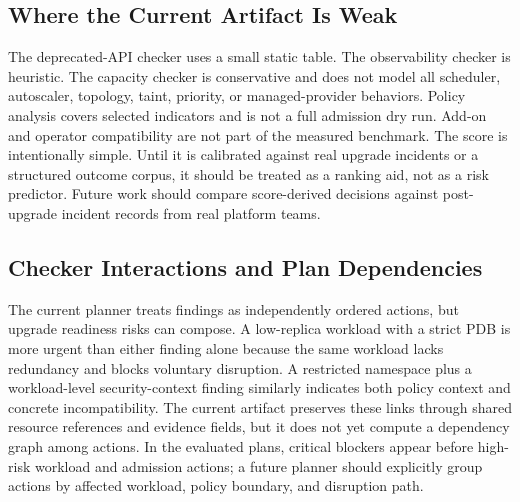 \documentclass[10pt,journal]{IEEEtran}
\begin{document}
\subsection{Where the Current Artifact Is Weak}
The deprecated-API checker uses a small static table. The observability checker is heuristic. The capacity checker is conservative and does not model all scheduler, autoscaler, topology, taint, priority, or managed-provider behaviors. Policy analysis covers selected indicators and is not a full admission dry run. Add-on and operator compatibility are not part of the measured benchmark. The score is intentionally simple. Until it is calibrated against real upgrade incidents or a structured outcome corpus, it should be treated as a ranking aid, not as a risk predictor. Future work should compare score-derived decisions against post-upgrade incident records from real platform teams.

\subsection{Checker Interactions and Plan Dependencies}
The current planner treats findings as independently ordered actions, but upgrade readiness risks can compose. A low-replica workload with a strict PDB is more urgent than either finding alone because the same workload lacks redundancy and blocks voluntary disruption. A restricted namespace plus a workload-level security-context finding similarly indicates both policy context and concrete incompatibility. The current artifact preserves these links through shared resource references and evidence fields, but it does not yet compute a dependency graph among actions. In the evaluated plans, critical blockers appear before high-risk workload and admission actions; a future planner should explicitly group actions by affected workload, policy boundary, and disruption path.
\end{document}
